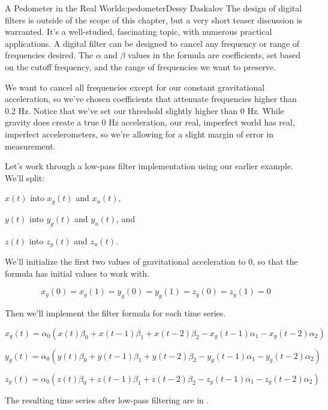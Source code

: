 \begin{aosachapter}{A Pedometer in the Real World}{s:pedometer}{Dessy Daskalov}
The design of digital filters is outside of the scope of this chapter,
but a very short teaser discussion is warranted. It's a well-studied,
fascinating topic, with numerous practical applications. A digital
filter can be designed to cancel any frequency or range of frequencies
desired. The $\alpha$ and $\beta$ values in the formula are
coefficients, set based on the cutoff frequency, and the range of
frequencies we want to preserve.

We want to cancel all frequencies except for our constant gravitational
acceleration, so we've chosen coefficients that attenuate frequencies
higher than 0.2 Hz. Notice that we've set our threshold slightly higher
than 0 Hz. While gravity does create a true 0 Hz acceleration, our real,
imperfect world has real, imperfect accelerometers, so we're allowing
for a slight margin of error in measurement.

\label{implementing-a-low-pass-filter}

Let's work through a low-pass filter implementation using our earlier
example. We'll split:

\begin{aosaitemize}

\item
  $x(t)$ into $x_{g}(t)$ and $x_{u}(t)$,
\item
  $y(t)$ into $y_{g}(t)$ and $y_{u}(t)$, and
\item
  $z(t)$ into $z_{g}(t)$ and $z_{u}(t)$.
\end{aosaitemize}

We'll initialize the first two values of gravitational acceleration to
0, so that the formula has initial values to work with.

\[x_{g}(0) = x_{g}(1) = y_{g}(0) = y_{g}(1) = z_{g}(0) = z_{g}(1) = 0\]

Then we'll implement the filter formula for each time series.

\[x_{g}(t) = \alpha_{0}(x(t)\beta_{0} + x(t-1)\beta_{1} + x(t-2)\beta_{2} - x_{g}(t-1)\alpha_{1} - x_{g}(t-2)\alpha_{2})\]

\[y_{g}(t) = \alpha_{0}(y(t)\beta_{0} + y(t-1)\beta_{1} + y(t-2)\beta_{2} - y_{g}(t-1)\alpha_{1} - y_{g}(t-2)\alpha_{2})\]

\[z_{g}(t) = \alpha_{0}(z(t)\beta_{0} + z(t-1)\beta_{1} + z(t-2)\beta_{2} - z_{g}(t-1)\alpha_{1} - z_{g}(t-2)\alpha_{2})\]

The resulting time series after low-pass filtering are in
.


\end{aosachapter}

